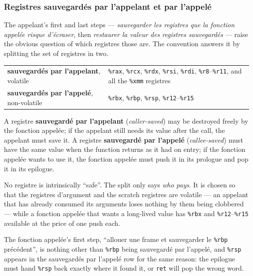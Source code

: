 \subsubsection{Registres sauvegardés par l'appelant et par l'appelé}
The appelant's first and last steps --- \textit{sauvegarder les registres que la
fonction appelée risque d'écraser}, then \textit{restaurer la valeur des
registres sauvegardés} --- raise the obvious question of which registres those
are. The convention answers it by splitting the set of registres in two.

\begin{center}
  \begin{tabularx}{\textwidth}{lX}
    \toprule
    \textbf{sauvegardés par l'appelant}, volatile &
      \texttt{\%rax}, \texttt{\%rcx}, \texttt{\%rdx}, \texttt{\%rsi},
      \texttt{\%rdi}, \texttt{\%r8}--\texttt{\%r11}, and all the
      \texttt{\%xmm} registres \\
    \addlinespace
    \textbf{sauvegardés par l'appelé}, non-volatile &
      \texttt{\%rbx}, \texttt{\%rbp}, \texttt{\%rsp},
      \texttt{\%r12}--\texttt{\%r15} \\
    \bottomrule
  \end{tabularx}
\end{center}

\begin{definition}
  A registre \textbf{sauvegardé par l'appelant} (\textit{caller-saved}) may be
  destroyed freely by the fonction appelée; if the appelant still needs its
  value after the call, the appelant must save it. A registre
  \textbf{sauvegardé par l'appelé} (\textit{callee-saved}) must have the same
  value when the function returns as it had on entry; if the fonction appelée
  wants to use it, the fonction appelée must push it in its prologue and pop it
  in its epilogue.
\end{definition}

\begin{remark}
  No registre is intrinsically ``safe''. The split only says \emph{who pays}. It
  is chosen so that the registres d'argument and the scratch registres are
  volatile --- an appelant that has already consumed its arguments loses nothing
  by them being clobbered --- while a fonction appelée that wants a long-lived
  value has \texttt{\%rbx} and \texttt{\%r12}--\texttt{\%r15} available at the
  price of one push each.
\end{remark}

\begin{remark}
  The fonction appelée's first step, ``allouer une frame et sauvegarder le
  \texttt{\%rbp} précédent'', is nothing other than \texttt{\%rbp} being
  sauvegardé par l'appelé, and \texttt{\%rsp} appears in the sauvegardés par
  l'appelé row for the same reason: the epilogue must hand \texttt{\%rsp} back
  exactly where it found it, or \texttt{ret} will pop the wrong word.
\end{remark}

